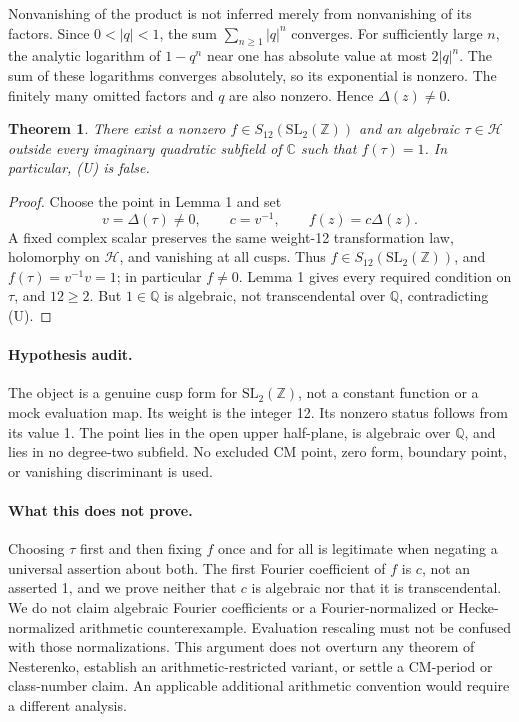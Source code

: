 \documentclass[11pt]{article}
\newtheorem{theorem}{Theorem}
\newcommand{\Q}{\mathbb Q}
\newcommand{\C}{\mathbb C}
\newcommand{\Hh}{\mathcal H}
\newcommand{\SL}{\mathrm{SL}_2(\mathbb Z)}
\begin{document}
Nonvanishing of the product is not inferred merely from nonvanishing
of its factors. Since $0<|q|<1$, the sum $\sum_{n\geq1}|q|^n$ converges.
For sufficiently large $n$, the analytic logarithm of $1-q^n$ near one
has absolute value at most $2|q|^n$. The sum of these logarithms converges
absolutely, so its exponential is nonzero. The finitely many omitted
factors and $q$ are also nonzero. Hence $\Delta(z)\ne0$.
\begin{theorem}
There exist a nonzero $f\in S_{12}(\SL)$ and an algebraic
$\tau\in\Hh$ outside every imaginary quadratic subfield of $\C$ such
that $f(\tau)=1$. In particular, (U) is false.
\end{theorem}
\begin{proof}
Choose the point in Lemma 1 and set
\[
 v=\Delta(\tau)\ne0,\qquad c=v^{-1},\qquad f(z)=c\Delta(z).
\]
A fixed complex scalar preserves the same weight-12 transformation law,
holomorphy on $\Hh$, and vanishing at all cusps.
Thus $f\in S_{12}(\SL)$, and $f(\tau)=v^{-1}v=1$; in particular $f\ne0$.
Lemma 1 gives every required condition on $\tau$, and $12\geq2$.
But $1\in\Q$ is algebraic, not transcendental over $\Q$, contradicting (U).
\end{proof}
\paragraph{Hypothesis audit.}
The object is a genuine cusp form for $\SL$, not a constant function
or a mock evaluation map. Its weight is the integer 12. Its nonzero
status follows from its value 1. The point lies in the open upper
half-plane, is algebraic over $\Q$, and lies in no degree-two subfield.
No excluded CM point, zero form, boundary point, or vanishing
discriminant is used.
\paragraph{What this does not prove.}
Choosing $\tau$ first and then fixing $f$ once and for all is legitimate
when negating a universal assertion about both.
The first Fourier coefficient of $f$ is $c$, not an asserted 1, and
we prove neither that $c$ is algebraic nor that it is transcendental.
We do not claim algebraic Fourier coefficients or a Fourier-normalized
or Hecke-normalized arithmetic counterexample. Evaluation rescaling
must not be confused with those normalizations. This argument does not
overturn any theorem of Nesterenko, establish an arithmetic-restricted
variant, or settle a CM-period or class-number claim. An applicable
additional arithmetic convention would require a different analysis.
\newpage
\end{document}
